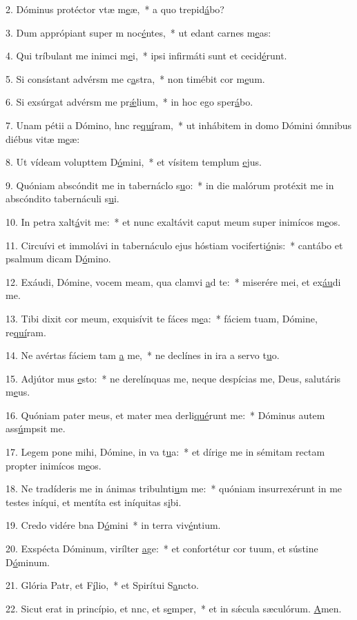 2. Dóminus protéctor vtæ m\uline{e}æ,~* a quo trepid\uline{á}bo?\par 
3. Dum apprópiant super m noc\uline{é}ntes,~* ut edant carnes m\uline{e}as:\par 
4. Qui tríbulant me inimci m\uline{e}i,~* ipsi infirmáti sunt et cecid\uline{é}runt.\par 
5. Si consístant advérsm me c\uline{a}stra,~* non timébit cor m\uline{e}um.\par 
6. Si exsúrgat advérsm me pr\uline{ǽ}lium,~* in hoc ego sper\uline{á}bo.\par 
7. Unam pétii a Dómino, hnc re\uline{quí}ram,~* ut inhábitem in domo Dómini ómnibus diébus vitæ m\uline{e}æ:\par 
8. Ut vídeam volupttem D\uline{ó}mini,~* et vísitem templum \uline{e}jus.\par 
9. Quóniam abscóndit me in tabernáclo s\uline{u}o:~* in die malórum protéxit me in abscóndito tabernáculi s\uline{u}i.\par 
10. In petra xalt\uline{á}vit me:~* et nunc exaltávit caput meum super inimícos m\uline{e}os.\par 
11. Circuívi et immolávi in tabernáculo ejus hóstiam vociferti\uline{ó}nis:~* cantábo et psalmum dicam D\uline{ó}mino.\par 
12. Exáudi, Dómine, vocem meam, qua clamvi \uline{a}d te:~* miserére mei, et ex\uline{áu}di me.\par 
13. Tibi dixit cor meum, exquisívit te fáces m\uline{e}a:~* fáciem tuam, Dómine, re\uline{quí}ram.\par 
14. Ne avértas fáciem tam \uline{a} me,~* ne declínes in ira a servo t\uline{u}o.\par 
15. Adjútor mus \uline{e}sto:~* ne derelínquas me, neque despícias me, Deus, salutáris m\uline{e}us.\par 
16. Quóniam pater meus, et mater mea derli\uline{qué}runt me:~* Dóminus autem ass\uline{ú}mpsit me.\par 
17. Legem pone mihi, Dómine, in va t\uline{u}a:~* et dírige me in sémitam rectam propter inimícos m\uline{e}os.\par 
18. Ne tradíderis me in ánimas tribulnti\uline{u}m me:~* quóniam insurrexérunt in me testes iníqui, et mentíta est iníquitas s\uline{i}bi.\par 
19. Credo vidére bna D\uline{ó}mini~* in terra viv\uline{é}ntium.\par 
20. Exspécta Dóminum, virílter \uline{a}ge:~* et confortétur cor tuum, et sústine D\uline{ó}minum.\par 
21. Glória Patr, et F\uline{í}lio,~* et Spirítui S\uline{a}ncto.\par 
22. Sicut erat in princípio, et nnc, et s\uline{e}mper,~* et in sǽcula sæculórum. \uline{A}men.\par 
